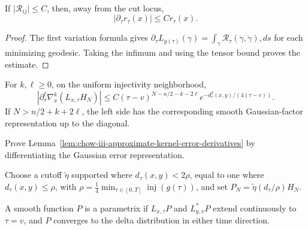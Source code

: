 \begin{lemma}
\label{lem:chow-iii-changing-distance-bound}
If \(\lvert\mathcal R_{ij}\rvert\le C\), then, away from the cut locus,
\[
 \left|\partial_\tau r_\tau(x)\right|\le C r_\tau(x).
\]
\end{lemma}
\begin{proof}
The first variation formula gives
\(
 \partial_\tau L_{g(\tau)}(\gamma)
 =\int_\gamma\mathcal R_\tau(\dot\gamma,\dot\gamma),ds
\)
for each minimizing geodesic.  Taking the infimum and using the tensor bound
proves the estimate.
\end{proof}

\begin{lemma}
\label{lem:chow-iii-approximate-kernel-error-derivatives}
For \(k,\ell\ge0\), on the uniform injectivity neighborhood,
\[
 \left|\partial_\tau^\ell\nabla_x^k(L_{x,\tau}H_N)\right|
 \le C(\tau-v)^{N-n/2-k-2\ell}
 e^{-d_\tau^2(x,y)/(4(\tau-v))}.
\]
If \(N>n/2+k+2\ell\), the left side has the corresponding smooth
Gaussian-factor representation up to the diagonal.
\end{lemma}

\begin{claim}
\label{clm:chow-iii-error-derivative-exercise}
Prove Lemma~\ref{lem:chow-iii-approximate-kernel-error-derivatives} by
differentiating the Gaussian error representation.
\end{claim}

Choose a cutoff \(\widetilde\eta\) supported where \(d_\tau(x,y)<2\rho\),
equal to one where \(d_\tau(x,y)\le\rho\), with
\(
 \rho=\frac14\min_{\tau\in[0,T]}\operatorname{inj}(g(\tau))
\), and set \(P_N=\widetilde\eta(d_\tau/\rho)H_N\).

\begin{definition}
\label{def:chow-iii-evolving-parametrix}
A smooth function \(P\) is a parametrix if \(L_{x,\tau}P\) and
\(L^*_{y,v}P\) extend continuously to \(\tau=v\), and \(P\) converges to the
delta distribution in either time direction.
\end{definition}

